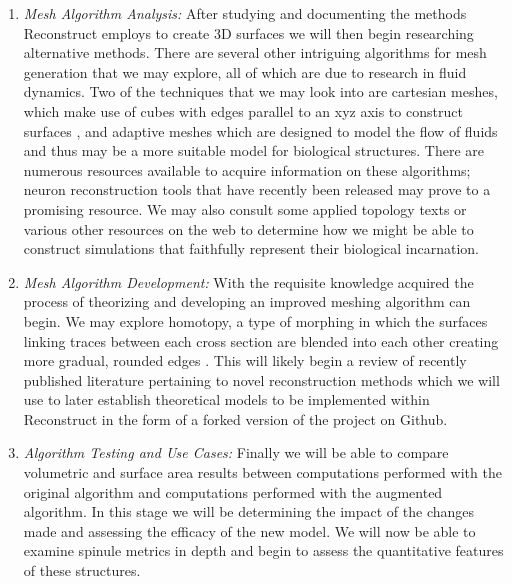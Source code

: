 \documentclass{article}
\begin{document}
\begin{enumerate}
    \item \textit{Mesh Algorithm Analysis:}
    After studying and documenting the methods Reconstruct employs to create 3D surfaces we will then begin researching alternative methods. There are several other intriguing algorithms for mesh generation that we may explore, all of which are due to research in fluid dynamics. Two of the techniques that we may look into are cartesian meshes, which make use of cubes with edges parallel to an xyz axis to construct surfaces \cite{berger1998aspects}, and adaptive meshes which are designed to model the flow of fluids \cite{cristini2001adaptive} and thus may be a more suitable model for biological structures. There are numerous resources available to acquire information on these algorithms; neuron reconstruction tools that have recently been released \cite{abdellah2018neuromorphovis} may prove to a promising resource. We may also consult some applied topology texts \cite{sack1999handbook} or various other resources on the web
    to determine how we might be able to construct simulations that faithfully represent their biological incarnation.
    \item \textit{Mesh Algorithm Development:}
    With the requisite knowledge acquired the process of theorizing and developing an improved meshing algorithm can begin. We may explore homotopy, a type of morphing in which the surfaces linking traces between each cross section are blended into each other creating more gradual, rounded edges \cite{bajaj1996arbitrary}. This will likely begin a review of recently published literature pertaining to novel reconstruction methods which we will use to later establish theoretical models to be implemented within Reconstruct in the form of a forked version of the project on Github.
    \item \textit{Algorithm Testing and Use Cases:}
    Finally we will be able to compare volumetric and surface area results between computations performed with the original algorithm and computations performed with the augmented algorithm. In this stage we will be determining the impact of the changes made and assessing the efficacy of the new model. We will now be able to examine spinule metrics in depth and begin to assess the quantitative features of these structures.

\end{enumerate}



\end{document}
